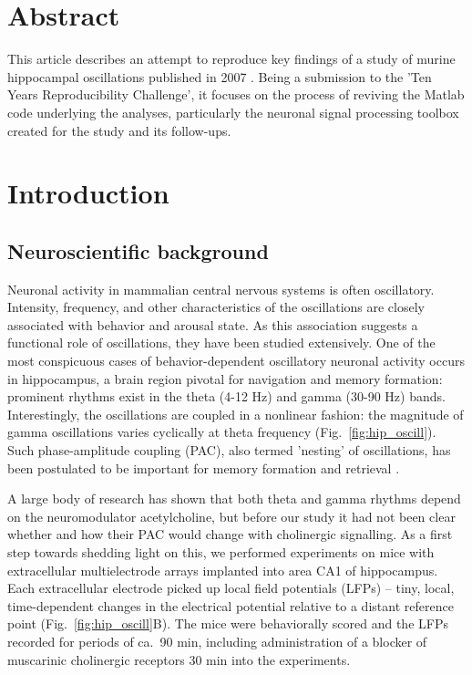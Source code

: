 \section{Abstract}
This article describes an attempt to reproduce key findings of a study of murine hippocampal oscillations published in 2007 \cite{hentschke_muscarinic_2007}. Being a submission to the 'Ten Years Reproducibility Challenge', it focuses on the process of reviving the Matlab code underlying the analyses, particularly the neuronal signal processing toolbox created for the study and its follow-ups.

\section{Introduction}
\subsection{Neuroscientific background}
\label{subsec:background}
Neuronal activity in mammalian central nervous systems is often oscillatory. Intensity, frequency, and other characteristics of the oscillations are closely associated with behavior and arousal state. As this association suggests a functional role of oscillations, they have been studied extensively. One of the most conspicuous cases of behavior-dependent oscillatory neuronal activity occurs in hippocampus, a brain region pivotal for navigation and memory formation: prominent rhythms exist in the theta (4-12 Hz) and gamma (30-90 Hz) bands. 
Interestingly, the oscillations are coupled in a nonlinear fashion: the magnitude of gamma oscillations varies cyclically at theta frequency \cite{soltesz_low-_1993} (Fig.~\ref{fig:hip_oscill}). Such phase-amplitude coupling (PAC), also termed 'nesting' of oscillations, has been postulated to be important for memory formation and retrieval \cite{lisman_storage_1995, hyafil_neural_2015}.

A large body of research has shown that both theta and gamma rhythms depend on the neuromodulator acetylcholine, but before our study \cite{hentschke_muscarinic_2007} it had not been clear whether and how their PAC would change with cholinergic signalling. As a first step towards shedding light on this, we performed experiments on mice with extracellular multielectrode arrays implanted into area CA1 of hippocampus. Each extracellular electrode picked up local field potentials (LFPs) -- tiny, local, time-dependent changes in the electrical potential relative to a distant reference point (Fig.~\ref{fig:hip_oscill}B). The mice were behaviorally scored and the LFPs recorded for periods of ca.\ 90 min, including administration of a blocker of muscarinic cholinergic receptors 30 min into the experiments. 

